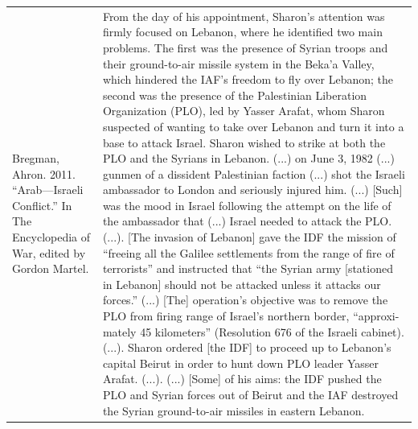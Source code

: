 {\begin{longtable}{p{}p{}}
\\
Bregman, Ahron. 2011. “Arab—Israeli Conflict.” In The Encyclopedia of War, edited by Gordon Martel. & From the day of his appointment, Sharon's attention was firmly focused on Lebanon, where he identified two main problems. The first was the presence of Syrian troops and their ground-to-air missile system in the Beka'a Valley, which hindered the IAF's freedom to fly over Lebanon; the second was the presence of the Palestinian Liberation Organization (PLO), led by Yasser Arafat, whom Sharon suspected of wanting to take over Lebanon and turn it into a base to attack Israel. Sharon wished to strike at both the PLO and the Syrians in Lebanon. (...) on June 3, 1982 (...) gunmen of a dissident Palestinian faction (...) shot the Israeli ambassador to London and seriously injured him. (...) [Such] was the mood in Israel following the attempt on the life of the ambassador that (...) Israel needed to attack the PLO. (...).
[The invasion of Lebanon] gave the IDF the mission of “freeing all the Galilee settlements from the range of fire of terrorists” and instructed that “the Syrian army [stationed in Lebanon] should not be attacked unless it attacks our forces.” (...) [The] operation's objective was to remove the PLO from firing range of Israel's northern border, “approxi-mately 45 kilometers” (Resolution 676 of the Israeli cabinet). (...). 
Sharon ordered [the IDF] to proceed up to Lebanon's capital Beirut in order to hunt down PLO leader Yasser Arafat. (...).
(...) [Some] of his aims: the IDF pushed the PLO and Syrian forces out of Beirut and the IAF destroyed the Syrian ground-to-air missiles in eastern Lebanon.
\\

\end{longtable}}
